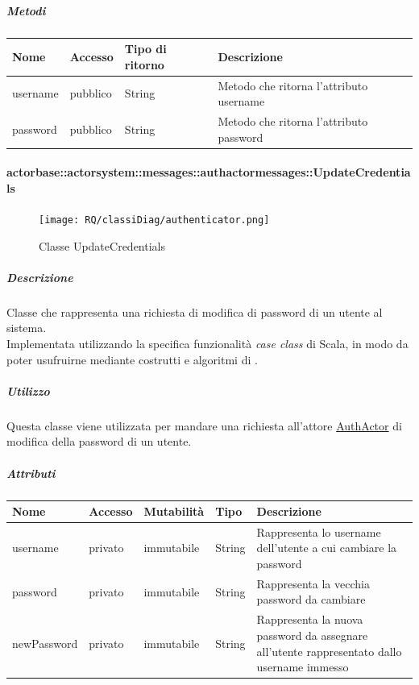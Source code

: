 \documentclass{scalatekids-article}
\begin{document}
\subparagraph{Metodi}
\begin{tabular}{| l | l | l | l |}
  \hline
  Nome & Accesso & Tipo di ritorno & Descrizione\\
  \hline
  username & pubblico & String & Metodo che ritorna l'attributo username\\
  \hline
  password & pubblico & String & Metodo che ritorna l'attributo password\\
  \hline
\end{tabular}

\paragraph{actorbase::actorsystem::messages::authactormessages::UpdateCredentials}
\label{sec:actorbase::actorsystem::messages::authactormessages::UpdateCredentials}

\begin{figure}[H]
  \begin{center}
    \texttt{[image: RQ/classiDiag/authenticator.png]}
    \caption{Classe UpdateCredentials}
  \end{center}
\end{figure}

\subparagraph{Descrizione}
Classe che rappresenta una richiesta di modifica di password di un utente al sistema.\\Implementata utilizzando la specifica funzionalità \textit{case class} di Scala,
in modo da poter usufruirne mediante costrutti e algoritmi di
.

\subparagraph{Utilizzo}
Questa classe viene utilizzata per mandare una richiesta all'attore
\hyperref[sec:actorbase::actorsystem::actors::authactormessages::AuthActor]{AuthActor}
di modifica della password di un utente.

\subparagraph{Attributi}
\begin{tabular}{| p{2cm} | p{1.5cm} | p{2cm} | p{3cm} | p{8.5cm} |}
  \hline
  Nome & Accesso & Mutabilità & Tipo & Descrizione\\
  \hline
  username & privato & immutabile & String & Rappresenta lo username dell'utente a cui cambiare la password \\
  \hline
  password & privato & immutabile & String & Rappresenta la vecchia password da cambiare \\
  \hline
  newPassword & privato & immutabile & String & Rappresenta la nuova password da assegnare all'utente rappresentato dallo username immesso \\
  \hline
\end{tabular}
\end{document}
